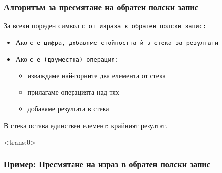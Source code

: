 \documentclass[alsotrans, beameroptions={aspectratio=169}]{beamerswitch}
\begin{document}
\begin{frame}
  \frametitle{Алгоритъм за пресмятане на обратен полски запис}
  За всеки пореден символ \tt c от израза в обратен полски запис:\pause
  \begin{itemize}[<+->]
  \item Ако \tt c е цифра, добавяме стойността ѝ в стека за резултати
  \item Ако \tt c е (двуместна) операция:
    \begin{itemize}
    \item изваждаме най-горните два елемента от стека
    \item прилагаме операцията над тях
    \item добавяме резултата в стека
    \end{itemize}
  \end{itemize}
  \onslide<+->
  В стека остава единствен елемент: крайният резултат.
\end{frame}

\begin{frame}<trans:0>
  \frametitle{Пример: Пресмятане на израз в обратен полски запис}

  \begin{center}
  \end{center}
\end{frame}
\end{document}
